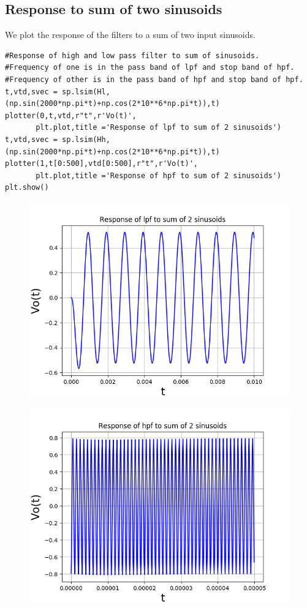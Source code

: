 \documentclass[11pt, a4paper]{article}
\begin{document}
\subsection{Response to sum of two sinusoids}
{
We plot the response of the filters to a sum of two input sinusoids.
}
\begin{verbatim}
#Response of high and low pass filter to sum of sinusoids.
#Frequency of one is in the pass band of lpf and stop band of hpf.
#Frequency of other is in the pass band of hpf and stop band of hpf.
t,vtd,svec = sp.lsim(Hl,(np.sin(2000*np.pi*t)+np.cos(2*10**6*np.pi*t)),t)
plotter(0,t,vtd,r"t",r'Vo(t)',
       plt.plot,title ='Response of lpf to sum of 2 sinusoids')
t,vtd,svec = sp.lsim(Hh,(np.sin(2000*np.pi*t)+np.cos(2*10**6*np.pi*t)),t)
plotter(1,t[0:500],vtd[0:500],r"t",r'Vo(t)',
       plt.plot,title ='Response of hpf to sum of 2 sinusoids')
plt.show()

\end{verbatim}
\begin{figure}[!tbh]
   	\centering
   	\includegraphics[scale=0.5]{img5.png}
   	\label{fig:32}
   \end{figure}
\begin{figure}[!tbh]
   	\centering
   	\includegraphics[scale=0.5]{img6.png}
   	\label{fig:32}
   \end{figure}
\end{document}
